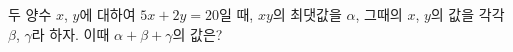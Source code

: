 두 양수 $x$, $y$에 대하여 $5x+2y=20$일 때, $xy$의 최댓값을 $\alpha$, 그때의 $x$, $y$의 값을 각각 $\beta$, $\gamma$라 하자. 이때 $\alpha+\beta+\gamma$의 값은?
